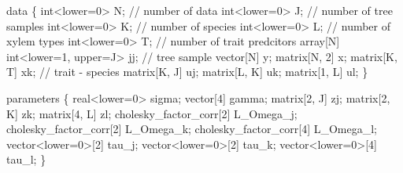 \documentclass[
  12pt,
  letterpaper,
  DIV=11,
  numbers=noendperiod]{scrartcl}
\newenvironment{Shaded}{\begin{snugshade}}{\end{snugshade}}
\newcommand{\CommentTok}[1]{\textcolor[rgb]{0.37,0.37,0.37}{#1}}
\newcommand{\DataTypeTok}[1]{\textcolor[rgb]{0.68,0.00,0.00}{#1}}
\newcommand{\DecValTok}[1]{\textcolor[rgb]{0.68,0.00,0.00}{#1}}
\newcommand{\KeywordTok}[1]{\textcolor[rgb]{0.00,0.23,0.31}{#1}}
\newcommand{\NormalTok}[1]{\textcolor[rgb]{0.00,0.23,0.31}{#1}}
\begin{document}
\begin{Shaded}
\begin{Highlighting}[]
\KeywordTok{data}\NormalTok{ \{}
  \DataTypeTok{int}\NormalTok{\textless{}}\KeywordTok{lower}\NormalTok{=}\DecValTok{0}\NormalTok{\textgreater{} N; }\CommentTok{// number of data}
  \DataTypeTok{int}\NormalTok{\textless{}}\KeywordTok{lower}\NormalTok{=}\DecValTok{0}\NormalTok{\textgreater{} J; }\CommentTok{// number of tree samples}
  \DataTypeTok{int}\NormalTok{\textless{}}\KeywordTok{lower}\NormalTok{=}\DecValTok{0}\NormalTok{\textgreater{} K; }\CommentTok{// number of species}
  \DataTypeTok{int}\NormalTok{\textless{}}\KeywordTok{lower}\NormalTok{=}\DecValTok{0}\NormalTok{\textgreater{} L; }\CommentTok{// number of xylem types}
  \DataTypeTok{int}\NormalTok{\textless{}}\KeywordTok{lower}\NormalTok{=}\DecValTok{0}\NormalTok{\textgreater{} T; }\CommentTok{// number of trait predcitors}
  \DataTypeTok{array}\NormalTok{[N] }\DataTypeTok{int}\NormalTok{\textless{}}\KeywordTok{lower}\NormalTok{=}\DecValTok{1}\NormalTok{, }\KeywordTok{upper}\NormalTok{=J\textgreater{} jj; }\CommentTok{// tree sample}
  \DataTypeTok{vector}\NormalTok{[N] y;}
  \DataTypeTok{matrix}\NormalTok{[N, }\DecValTok{2}\NormalTok{] x;}
  \DataTypeTok{matrix}\NormalTok{[K, T] xk; }\CommentTok{// trait {-} species}
  \DataTypeTok{matrix}\NormalTok{[K, J] uj;}
  \DataTypeTok{matrix}\NormalTok{[L, K] uk;}
  \DataTypeTok{matrix}\NormalTok{[}\DecValTok{1}\NormalTok{, L] ul;}
\NormalTok{\}}

\KeywordTok{parameters}\NormalTok{ \{}
  \DataTypeTok{real}\NormalTok{\textless{}}\KeywordTok{lower}\NormalTok{=}\DecValTok{0}\NormalTok{\textgreater{} sigma;}
  \DataTypeTok{vector}\NormalTok{[}\DecValTok{4}\NormalTok{] gamma;}
  \DataTypeTok{matrix}\NormalTok{[}\DecValTok{2}\NormalTok{, J] zj;}
  \DataTypeTok{matrix}\NormalTok{[}\DecValTok{2}\NormalTok{, K] zk;}
  \DataTypeTok{matrix}\NormalTok{[}\DecValTok{4}\NormalTok{, L] zl;}
  \DataTypeTok{cholesky\_factor\_corr}\NormalTok{[}\DecValTok{2}\NormalTok{] L\_Omega\_j;}
  \DataTypeTok{cholesky\_factor\_corr}\NormalTok{[}\DecValTok{2}\NormalTok{] L\_Omega\_k;}
  \DataTypeTok{cholesky\_factor\_corr}\NormalTok{[}\DecValTok{4}\NormalTok{] L\_Omega\_l;}
  \DataTypeTok{vector}\NormalTok{\textless{}}\KeywordTok{lower}\NormalTok{=}\DecValTok{0}\NormalTok{\textgreater{}[}\DecValTok{2}\NormalTok{] tau\_j;}
  \DataTypeTok{vector}\NormalTok{\textless{}}\KeywordTok{lower}\NormalTok{=}\DecValTok{0}\NormalTok{\textgreater{}[}\DecValTok{2}\NormalTok{] tau\_k;}
  \DataTypeTok{vector}\NormalTok{\textless{}}\KeywordTok{lower}\NormalTok{=}\DecValTok{0}\NormalTok{\textgreater{}[}\DecValTok{4}\NormalTok{] tau\_l;}
\NormalTok{\}}


\end{Highlighting}
\end{Shaded}
\end{document}

